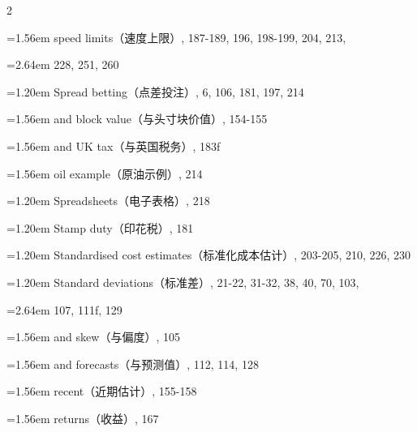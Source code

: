 {\begin{multicols}{2}
\par \noindent\hangindent=1.56em\hspace*{0.36em} speed limits（速度上限）, 187-189, 196, 198-199, 204, 213,
\par \noindent\hangindent=2.64em\hspace*{1.44em} 228, 251, 260
\par \noindent\hangindent=1.20em\hspace*{0.00em} Spread betting（点差投注）, 6, 106, 181, 197, 214
\par \noindent\hangindent=1.56em\hspace*{0.36em} and block value（与头寸块价值）, 154-155
\par \noindent\hangindent=1.56em\hspace*{0.36em} and UK tax（与英国税务）, 183f
\par \noindent\hangindent=1.56em\hspace*{0.36em} oil example（原油示例）, 214
\par \noindent\hangindent=1.20em\hspace*{0.00em} Spreadsheets（电子表格）, 218
\par \noindent\hangindent=1.20em\hspace*{0.00em} Stamp duty（印花税）, 181
\par \noindent\hangindent=1.20em\hspace*{0.00em} Standardised cost estimates（标准化成本估计）, 203-205, 210, 226, 230
\par \noindent\hangindent=1.20em\hspace*{0.00em} Standard deviations（标准差）, 21-22, 31-32, 38, 40, 70, 103,
\par \noindent\hangindent=2.64em\hspace*{1.44em} 107, 111f, 129
\par \noindent\hangindent=1.56em\hspace*{0.36em} and skew（与偏度）, 105
\par \noindent\hangindent=1.56em\hspace*{0.36em} and forecasts（与预测值）, 112, 114, 128
\par \noindent\hangindent=1.56em\hspace*{0.36em} recent（近期估计）, 155-158
\par \noindent\hangindent=1.56em\hspace*{0.36em} returns（收益）, 167

\end{multicols}}
